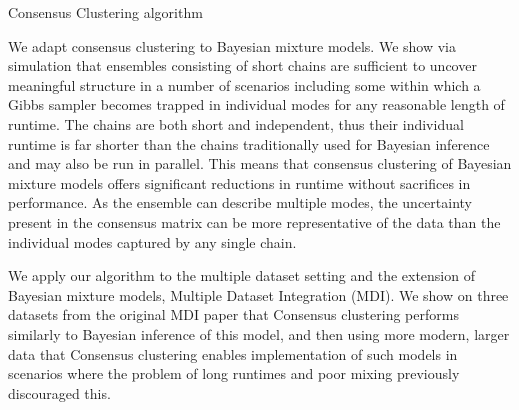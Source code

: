 \documentclass{bioinfo}
\begin{document}
\begin{algorithm} \label{algorithm:CC}
	\caption{Consensus Clustering algorithm}
\end{algorithm}

We adapt consensus clustering to Bayesian mixture models. We show via simulation that ensembles consisting of short chains are sufficient to uncover meaningful structure in a number of scenarios including some within which a Gibbs sampler becomes trapped in individual modes for any reasonable length of runtime. The chains are both short and independent, thus their individual runtime is far shorter than the chains traditionally used for Bayesian inference and may also be run in parallel. This means that consensus clustering of Bayesian mixture models offers significant reductions in runtime without sacrifices in performance. As the ensemble can describe multiple modes, the uncertainty present in the consensus matrix can be more representative of the data than the individual modes captured by any single chain.

 We apply our algorithm to the multiple dataset setting and the extension of Bayesian mixture models, Multiple Dataset Integration (MDI). We show on three datasets from the original MDI paper that Consensus clustering performs similarly to Bayesian inference of this model, and then using more modern, larger data that Consensus clustering enables implementation of such models in scenarios where the problem of long runtimes and poor mixing previously discouraged this. 
\end{document}
